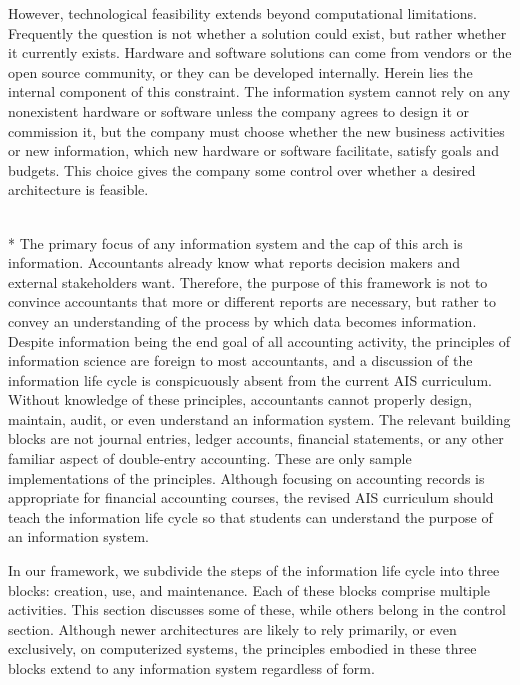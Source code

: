 \documentclass[12pt]{article}
\newcommand{\SubSection}[1]{\vspace{.15in}{\centering{}\normalsize{}\textbf{#1}}\\*\indent{}}
\begin{document}
However, technological feasibility extends beyond computational limitations. Frequently the question is not whether a solution could exist, but rather whether it currently exists. Hardware and software solutions can come from vendors or the open source community, or they can be developed internally. Herein lies the internal component of this constraint. The information system cannot rely on any nonexistent hardware or software unless the company agrees to design it or commission it, but the company must choose whether the new business activities or new information, which new hardware or software facilitate, satisfy goals and budgets. This choice gives the company some control over whether a desired architecture is feasible.

\SubSection{Information}
The primary focus of any information system and the cap of this arch is information. Accountants already know what reports decision makers and external stakeholders want. Therefore, the purpose of this framework is not to convince accountants that more or different reports are necessary, but rather to convey an understanding of the process by which data becomes information. Despite information being the end goal of all accounting activity, the principles of information science are foreign to most accountants, and a discussion of the information life cycle is conspicuously absent from the current AIS curriculum. Without knowledge of these principles, accountants cannot properly design, maintain, audit, or even understand an information system. The relevant building blocks are not journal entries, ledger accounts, financial statements, or any other familiar aspect of double-entry accounting. These are only sample implementations of the principles. Although focusing on accounting records is appropriate for financial accounting courses, the revised AIS curriculum should teach the information life cycle so that students can understand the purpose of an information system.

In our framework, we subdivide the steps of the information life cycle into three blocks: creation, use, and maintenance. Each of these blocks comprise multiple activities. This section discusses some of these, while others belong in the control section. Although newer architectures are likely to rely primarily, or even exclusively, on computerized systems, the principles embodied in these three blocks extend to any information system regardless of form.
\end{document}
